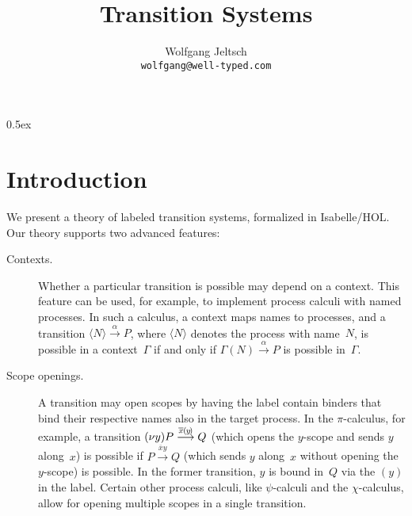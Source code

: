 \documentclass[a4paper,11pt]{article}
\begin{document}
\title{Transition Systems}
\author{Wolfgang Jeltsch\\\small\texttt{wolfgang@well-typed.com}}

\maketitle

\tableofcontents

\parindent 0pt\parskip 0.5ex

\section{Introduction}

We present a theory of labeled transition systems, formalized in Isabelle/HOL. Our theory supports
two advanced features:
\begin{description}

\item[Contexts.]

Whether a particular transition is possible may depend on a context. This feature can be used, for
example, to implement process calculi with named processes. In such a calculus, a context maps names
to processes, and a transition $\langle N\rangle \overset{\alpha}{\longrightarrow} P$, where
$\langle N\rangle$ denotes the process with name~$N$, is possible in a context~$\Gamma$ if and only
if $\Gamma(N) \overset{\alpha}{\longrightarrow} P$ is possible in~$\Gamma$.

\item[Scope openings.]

A transition may open scopes by having the label contain binders that bind their respective names
also in the target process. In the $\pi$-calculus, for example, a transition
$(\nu y)P \overset{\overline{x}\hspace{-0.03em}(\hspace{-.06em}y\hspace{-.12em})}{\longrightarrow}
Q$ (which opens the $y$-scope and sends $y$ along~$x$) is possible if $P
\overset{\overline{x}y}{\longrightarrow} Q$ (which sends $y$ along~$x$ without opening the
$y$-scope) is possible. In the former transition, $y$ is bound in~$Q$ via the $(y)$ in the label.
Certain other process calculi, like $\psi$-calculi and the $\chi$-calculus, allow for opening
multiple scopes in a single transition.

\end{description}


\end{document}
